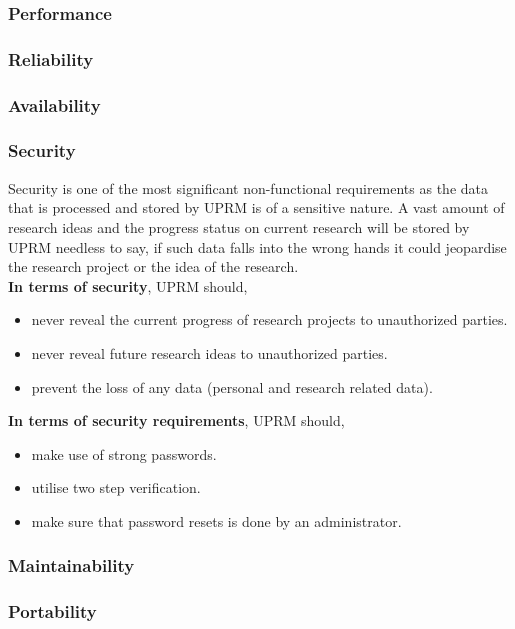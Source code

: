
\subsubsection{Performance}

\subsubsection{Reliability}

\subsubsection{Availability}

\subsubsection{Security}
Security is one of the most significant non-functional requirements as the data that is processed and stored by UPRM is of a sensitive nature. 
A vast amount of research ideas and the progress status on current research will be stored by UPRM needless to say, if such data falls into the wrong hands it could jeopardise the research project or the idea of the research.\\ 

\textbf{In terms of security}, UPRM should,
	\begin{itemize} 
		\item never reveal the current progress of research projects to unauthorized parties.
		\item never reveal future research ideas to unauthorized parties.
		\item prevent the loss of any data (personal and research related data).
	\end{itemize}

\textbf{In terms of security requirements}, UPRM should,
	\begin{itemize} 
		\item make use of strong passwords.
		\item utilise two step verification.
		\item make sure that password resets is done by an administrator.
	\end{itemize}

\subsubsection{Maintainability}

\subsubsection{Portability}